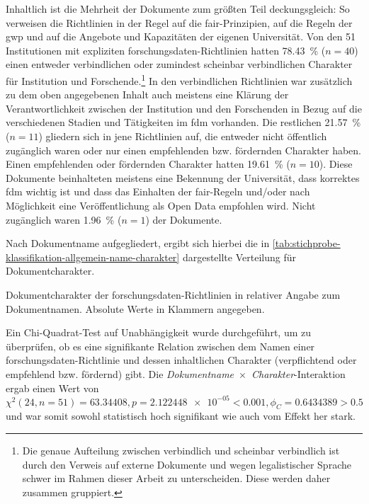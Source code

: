 Inhaltlich ist die Mehrheit der Dokumente zum größten Teil deckungsgleich:
So verweisen die Richtlinien in der Regel auf die \gls{fair}-Prinzipien, auf die Regeln der \gls{gwp} und auf die Angebote und Kapazitäten der eigenen Universität.
Von den \num{51} Institutionen mit expliziten \gls{forschungsdaten}-Richtlinien hatten \SI{78,43}{\percent} ($n=\num{40}$) einen entweder verbindlichen oder zumindest scheinbar verbindlichen Charakter für Institution und Forschende.\footnote{Die genaue Aufteilung zwischen verbindlich und scheinbar verbindlich ist durch den Verweis auf externe Dokumente und wegen legalistischer Sprache schwer im Rahmen dieser Arbeit zu unterscheiden. Diese werden daher zusammen gruppiert.}
In den verbindlichen Richtlinien war zusätzlich zu dem oben angegebenen Inhalt auch meistens eine Klärung der Verantwortlichkeit zwischen der Institution und den Forschenden in Bezug auf die verschiedenen Stadien und Tätigkeiten im \gls{fdm} vorhanden.
Die restlichen \SI{21,57}{\percent} ($n=\num{11}$) gliedern sich in jene Richtlinien auf, die entweder nicht öffentlich zugänglich waren oder nur einen empfehlenden bzw. fördernden Charakter haben.
Einen empfehlenden oder fördernden Charakter hatten \SI{19,61}{\percent} ($n=\num{10}$).
Diese Dokumente beinhalteten meistens eine Bekennung der Universität, dass korrektes \gls{fdm} wichtig ist und dass das Einhalten der \gls{fair}-Regeln und/oder nach Möglichkeit eine Veröffentlichung als Open Data empfohlen wird.
Nicht zugänglich waren \SI{1,96}{\percent} ($n=\num{1}$) der Dokumente.

Nach Dokumentname aufgegliedert, ergibt sich hierbei die in \cref{tab:stichprobe-klassifikation-allgemein-name-charakter} dargestellte Verteilung für Dokumentcharakter.
\begin{table}[!htbp]
	\caption{Dokumentcharakter der \gls{forschungsdaten}-Richtlinien in relativer Angabe zum Dokumentnamen. Absolute Werte in Klammern angegeben.}
    
	\label{tab:stichprobe-klassifikation-allgemein-name-charakter}
\end{table}

Ein Chi-Quadrat-Test auf Unabhängigkeit wurde durchgeführt, um zu überprüfen, ob es eine signifikante Relation zwischen dem Namen einer \gls{forschungsdaten}-Richtlinie und dessen inhaltlichen Charakter (verpflichtend oder empfehlend bzw. fördernd) gibt.
Die \textit{Dokumentname}~$\times$~\textit{Charakter}-Interaktion ergab einen Wert von $\chi^2 (\num{24}, n=\num{51}) = \num[round-mode=places,round-precision=2]{63,34408}, p = \num[round-mode=places,round-precision=2]{2,122448e-05}<\num{0.001}, \phi_C=\num[round-mode=places,round-precision=2]{0.6434389}>\num{0.5}$ und war somit sowohl statistisch hoch signifikant wie auch vom Effekt her stark.

